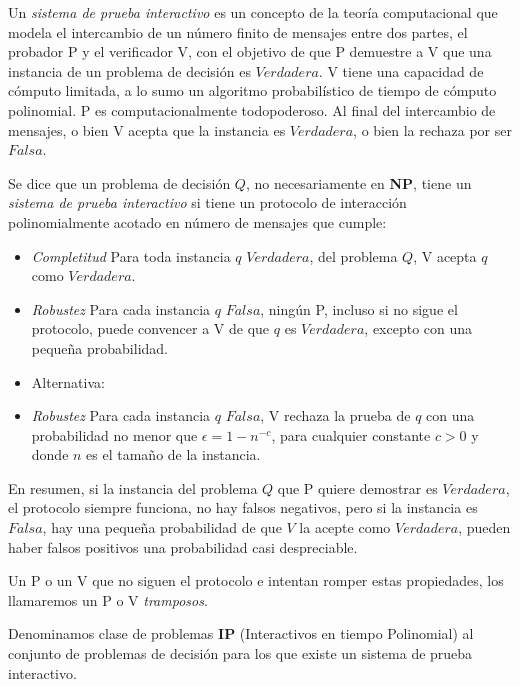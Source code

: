 Un \textit{sistema de prueba interactivo} es un concepto de la teoría computacional que modela el intercambio de un número finito de mensajes entre dos partes, el probador P y el verificador V, con el objetivo de que P demuestre a V que una instancia de un problema de decisión es $Verdadera$. V tiene una capacidad de cómputo limitada, a lo sumo un algoritmo probabilístico de tiempo de cómputo polinomial. P es computacionalmente todopoderoso. Al final del intercambio de mensajes, o bien V acepta que la instancia es $Verdadera$, o bien la rechaza por ser $Falsa$.

\begin{definition}

	
	Se dice que un problema de decisión $Q$, no necesariamente en \textbf{NP},  tiene un \textit{sistema de prueba interactivo} si tiene un protocolo de interacción polinomialmente acotado en número de mensajes que cumple:
	
	\begin{itemize}
		\item \textit{Completitud} Para toda instancia $q$ $Verdadera$, del problema $Q$, V acepta $q$ como $Verdadera$. 
		\item  \textit{Robustez} Para cada instancia $q$ $Falsa$, ningún P, incluso si no sigue el protocolo, puede convencer a V de que $q$ es $Verdadera$, excepto con una pequeña probabilidad.
		\item Alternativa:
		\item \textit{Robustez} Para cada instancia $q$ $Falsa$, V rechaza la prueba de $q$ con una probabilidad no menor que $\epsilon = 1-n^{-c}$, para cualquier constante $c>0$ y donde $n$ es el tamaño de la instancia.
	\end{itemize}

\end{definition}

En resumen, si la instancia del problema $Q$ que P quiere demostrar es $Verdadera$, el protocolo siempre funciona, no hay falsos negativos, pero si la instancia es $Falsa$, hay una pequeña probabilidad de que $V$ la acepte como $Verdadera$, pueden haber falsos positivos una probabilidad casi despreciable.

Un P o un V que no siguen el protocolo e intentan romper estas propiedades, los llamaremos un P o V \textit{tramposos}.


\begin{definition}
	Denominamos clase de problemas \textbf{IP} (Interactivos en tiempo Polinomial) al conjunto de problemas de decisión para los que existe un sistema de prueba interactivo.
\end{definition}

